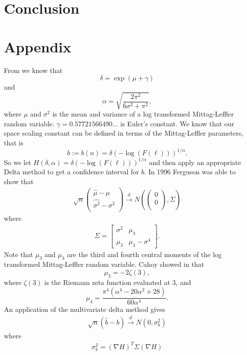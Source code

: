 \documentclass[honours,12pt]{unswthesis}
\newcommand{\1}{\mathbf 1}
\newcommand{\cd}{\overset{d}{\longrightarrow}}
\numberwithin{equation}{section}
\theoremstyle{definition}
\theoremstyle{remark}
\begin{document}
\chapter{Conclusion}


\chapter{Appendix}
From \cite{Cahoy2013} we know that
\[
\delta=\exp(\mu +\gamma)
\]
and
\[
\alpha=\sqrt{\frac{2\pi^2}{6\sigma^2+\pi^2}},
\]
where $\mu$ and $\sigma^2$ is the mean and variance of a log transformed Mittag-Leffler random variable. $\gamma=0.57721566490...$ is Euler's constant. We know that our space scaling constant can be defined in terms of the Mittag-Leffler parameters, that is
\[ 
b:=b(n)=\delta(-\log(F(\ell)))^{1/\alpha}.
\]
So we let $H(\delta,\alpha)=\delta(-\log(F(\ell)))^{1/\alpha}$ and then apply an appropriate Delta method to get a confidence interval for $b$. In 1996 Ferguson was able to show that \cite{Ferguson1996}
\begin{align*}
	\sqrt{n}\begin{pmatrix}
				\hat{\mu}-\mu\\
				\hat{\sigma^2}-\sigma^2\\				
			\end{pmatrix}
			\cd
			N\left(\begin{pmatrix}0\\0\\ \end{pmatrix},\Sigma	\right)
\end{align*}
where
\begin{align*}
	\Sigma=\begin{bmatrix}
		\sigma^2	& \mu_3\\
		\mu_3		& \mu_4-\sigma^4
	\end{bmatrix}.
\end{align*}
Note that $\mu_3$ and $\mu_4$ are the third and fourth central moments of the log transformed Mittag-Leffler random variable. Cahoy showed in \cite{Cahoy2013} that
\[
\mu_3=-2\zeta(3),
\]
where $\zeta(3)$ is the Riemann zeta function evaluated at 3, and
\[
\mu_4=\frac{\pi^4(\alpha^4-20\alpha^2+28)}{60\alpha^4}.
\] 
An application of the multivariate delta method gives
\begin{align*}
\sqrt{n}(\hat{b}-b)\cd N(0,\sigma^2_b)
\end{align*}
where
\begin{align*}
\sigma^2_b=(\nabla H)^T \Sigma (\nabla H)
\end{align*}
\end{document}
